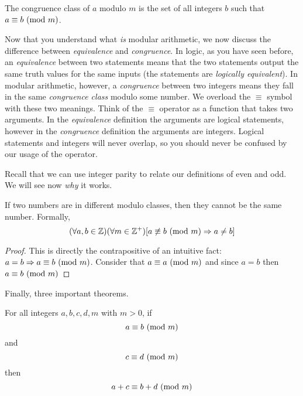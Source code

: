 \documentclass[main.tex]{subfiles}
\begin{document}
\begin{rem}
	The congruence class of \(a\) modulo \(m\) is the set of all integers \(b\) such that \(a \equiv b \ (\mathrm{mod}\ m)\).
\end{rem}

Now that you understand what \textit{is} modular arithmetic, we now discuss the difference between \textit{equivalence} and \textit{congruence}. In logic, as you have seen before, an \textit{equivalence} between two statements means that the two statements output the same truth values for the same inputs (the statements are \textit{logically equivalent}). In modular arithmetic, however, a \textit{congruence} between two integers means they fall in the same \textit{congruence class} modulo some number. We overload the \(\equiv\) symbol with these two meanings. Think of the \(\equiv\) operator as a function that takes two arguments. In the \textit{equivalence} definition the arguments are logical statements, however in the \textit{congruence} definition the arguments are integers. Logical statements and integers will never overlap, so you should never be confused by our usage of the operator.

Recall that we can use integer parity to relate our definitions of even and odd. We will see now \textit{why} it works.

\begin{thm}
	If two numbers are in different modulo classes, then they cannot be the same number. Formally, \[(\forall a,b \in \mathbb{Z})(\forall m \in \mathbb{Z}^+)[a \not\equiv b \ (\mathrm{mod}\ m) \Rightarrow a \neq b]\]
\end{thm}

\begin{proof}
	This is directly the contrapositive of an intuitive fact: \(a = b \Rightarrow a \equiv b \ (\mathrm{mod}\ m)\). Consider that \(a \equiv a \ (\mathrm{mod}\ m)\) and since \(a = b\) then \(a \equiv b \ (\mathrm{mod}\ m)\)
\end{proof}



Finally, three important theorems.

\begin{thm}
	For all integers \(a,b,c,d,m\) with \(m > 0\), if \[a \equiv b \ (\mathrm{mod}\ m)\] and \[c \equiv d \ (\mathrm{mod}\ m)\] then \[a+c \equiv b+d \ (\mathrm{mod}\ m)\]
\end{thm}
\end{document}
